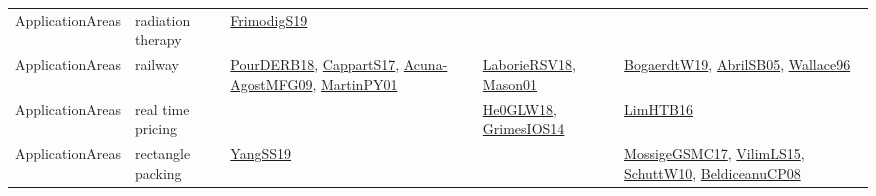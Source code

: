 {\begin{longtable}{llp{6cm}p{6cm}p{6cm}}
ApplicationAreas & radiation therapy & \href{papers/FrimodigS19.pdf}{FrimodigS19}\cite{FrimodigS19} &  & \\
ApplicationAreas & railway & \href{articles/PourDERB18.pdf}{PourDERB18}\cite{PourDERB18}, \href{papers/CappartS17.pdf}{CappartS17}\cite{CappartS17}, \href{papers/Acuna-AgostMFG09.pdf}{Acuna-AgostMFG09}\cite{Acuna-AgostMFG09}, \href{articles/MartinPY01.pdf}{MartinPY01}\cite{MartinPY01} & \href{articles/LaborieRSV18.pdf}{LaborieRSV18}\cite{LaborieRSV18}, \href{articles/Mason01.pdf}{Mason01}\cite{Mason01} & \href{papers/BogaerdtW19.pdf}{BogaerdtW19}\cite{BogaerdtW19}, \href{papers/AbrilSB05.pdf}{AbrilSB05}\cite{AbrilSB05}, \href{articles/Wallace96.pdf}{Wallace96}\cite{Wallace96}\\
ApplicationAreas & real time pricing &  & \href{papers/He0GLW18.pdf}{He0GLW18}\cite{He0GLW18}, \href{articles/GrimesIOS14.pdf}{GrimesIOS14}\cite{GrimesIOS14} & \href{papers/LimHTB16.pdf}{LimHTB16}\cite{LimHTB16}\\
ApplicationAreas & rectangle packing & \href{papers/YangSS19.pdf}{YangSS19}\cite{YangSS19} &  & \href{papers/MossigeGSMC17.pdf}{MossigeGSMC17}\cite{MossigeGSMC17}, \href{papers/VilimLS15.pdf}{VilimLS15}\cite{VilimLS15}, \href{papers/SchuttW10.pdf}{SchuttW10}\cite{SchuttW10}, \href{papers/BeldiceanuCP08.pdf}{BeldiceanuCP08}\cite{BeldiceanuCP08}\\

\end{longtable}}
